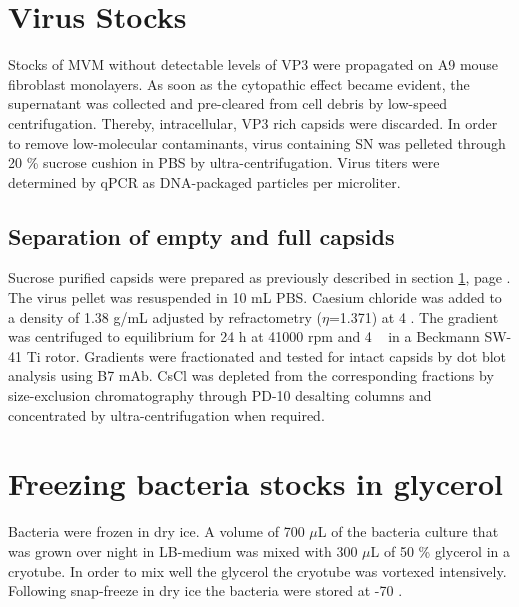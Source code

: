 
\section{Virus Stocks}
\label{Virus Stocks}
Stocks of MVM without detectable levels of VP3 were propagated on A9 mouse fibroblast monolayers. As soon as the cytopathic effect became evident, the supernatant was collected and pre-cleared from cell debris by low-speed centrifugation. Thereby, intracellular, VP3 rich capsids were discarded. In order to remove low-molecular contaminants, virus containing SN was pelleted through 20 \% sucrose cushion in PBS by ultra-centrifugation. Virus titers were determined by qPCR   as DNA-packaged particles per microliter.   

\subsection{Separation of empty and full capsids}

Sucrose purified capsids were prepared as previously described in section \ref{Virus Stocks}, page \pageref{Virus Stocks}. The virus pellet was resuspended in 10 mL PBS. Caesium chloride was added to a density of 1.38 g/mL adjusted by refractometry ($\eta$=1.371) at 4 \textcelsius. The gradient was centrifuged to equilibrium for 24 h at 41000 rpm and 4 \textcelsius~ in a Beckmann SW-41 Ti rotor. Gradients were fractionated and tested for intact capsids by dot blot analysis using B7 mAb. CsCl was depleted from the corresponding fractions by size-exclusion chromatography through PD-10 desalting columns and concentrated by ultra-centrifugation when required.          
   
   








\section{Freezing bacteria stocks in glycerol}
Bacteria were frozen in dry ice. A volume of 700 $\mu$L of the bacteria culture that was grown over night in LB-medium was mixed with 300 $\mu$L of 50 \% glycerol in a cryotube. In order to mix well the glycerol the cryotube was vortexed intensively. Following snap-freeze in dry ice the bacteria were stored at -70 \textcelsius.



